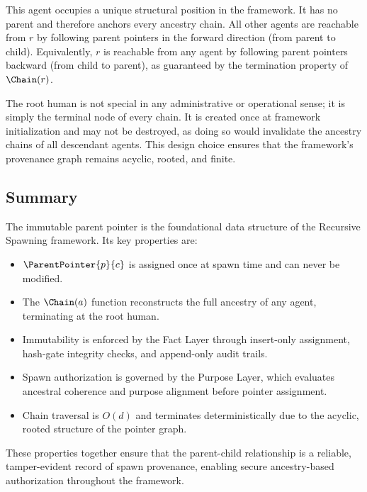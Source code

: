 This agent occupies a unique structural position in the framework. It has no parent and therefore anchors every ancestry chain. All other agents are reachable from $r$ by following parent pointers in the forward direction (from parent to child). Equivalently, $r$ is reachable from any agent by following parent pointers backward (from child to parent), as guaranteed by the termination property of $\Chain(r)$.

The root human is not special in any administrative or operational sense; it is simply the terminal node of every chain. It is created once at framework initialization and may not be destroyed, as doing so would invalidate the ancestry chains of all descendant agents. This design choice ensures that the framework's provenance graph remains acyclic, rooted, and finite.

\subsection{Summary}

The immutable parent pointer is the foundational data structure of the Recursive Spawning framework. Its key properties are:

\begin{itemize}
    \itemsep 0.1em
    \item $\ParentPointer{p}{c}$ is assigned once at spawn time and can never be modified.
    \item The $\Chain(a)$ function reconstructs the full ancestry of any agent, terminating at the root human.
    \item Immutability is enforced by the Fact Layer through insert-only assignment, hash-gate integrity checks, and append-only audit trails.
    \item Spawn authorization is governed by the Purpose Layer, which evaluates ancestral coherence and purpose alignment before pointer assignment.
    \item Chain traversal is $O(d)$ and terminates deterministically due to the acyclic, rooted structure of the pointer graph.
\end{itemize}

These properties together ensure that the parent-child relationship is a reliable, tamper-evident record of spawn provenance, enabling secure ancestry-based authorization throughout the framework.
